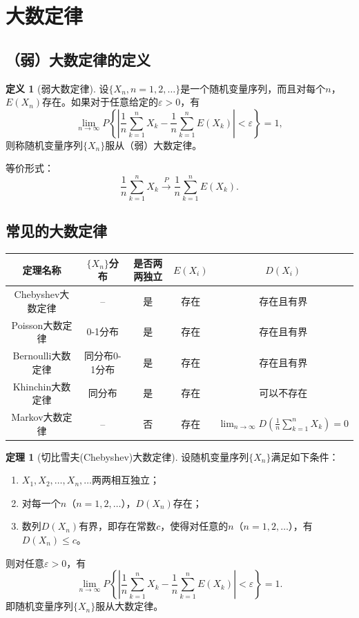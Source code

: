 \documentclass[11pt,a4paper]{report}
\theoremstyle{definition}
\newtheorem{definition}{定义}[chapter]
\newtheorem{theorem}{定理}[chapter]
\theoremstyle{plain}
\begin{document}
\section{大数定律}

\subsection{（弱）大数定律的定义}

\begin{definition}[弱大数定律]
设$\{X_n,n=1,2,\ldots\}$是一个随机变量序列，而且对每个$n$，$E(X_n)$存在。如果对于任意给定的$\varepsilon>0$，有
\[
\lim_{n\to\infty}P\left\{\left|\frac{1}{n}\sum_{k=1}^{n}X_k-\frac{1}{n}\sum_{k=1}^{n}E(X_k)\right|<\varepsilon\right\}=1,
\]
则称随机变量序列$\{X_n\}$服从（弱）大数定律。
\end{definition}

等价形式：
\[
\frac{1}{n}\sum_{k=1}^{n}X_k\stackrel{P}{\longrightarrow}\frac{1}{n}\sum_{k=1}^{n}E(X_k).
\]

\subsection{常见的大数定律}

\begin{center}
\begin{tabular}{c|c|c|c|c}
\hline
定理名称 & $\{X_n\}$分布 & 是否两两独立 & $E(X_i)$ & $D(X_i)$ \\
\hline
Chebyshev大数定律 & -- & 是 & 存在 & 存在且有界 \\
\hline
Poisson大数定律 & 0-1分布 & 是 & 存在 & 存在且有界 \\
\hline
Bernoulli大数定律 & 同分布0-1分布 & 是 & 存在 & 存在且有界 \\
\hline
Khinchin大数定律 & 同分布 & 是 & 存在 & 可以不存在 \\
\hline
Markov大数定律 & -- & 否 & 存在 & $\displaystyle\lim_{n\to\infty}D\left(\frac{1}{n}\sum_{k=1}^{n}X_k\right)=0$ \\
\hline
\end{tabular}
\end{center}

\begin{theorem}[切比雪夫(Chebyshev)大数定律]
设随机变量序列$\{X_n\}$满足如下条件：
\begin{enumerate}[label=(\arabic*),leftmargin=2em]
    \item $X_1,X_2,\ldots,X_n,\ldots$两两相互独立；
    \item 对每一个$n$（$n=1,2,\ldots$），$D(X_n)$存在；
    \item 数列$D(X_n)$有界，即存在常数$c$，使得对任意的$n$（$n=1,2,\ldots$），有$D(X_n)\leq c$。
\end{enumerate}
则对任意$\varepsilon>0$，有
\[
\lim_{n\to\infty}P\left\{\left|\frac{1}{n}\sum_{k=1}^{n}X_k-\frac{1}{n}\sum_{k=1}^{n}E(X_k)\right|<\varepsilon\right\}=1.
\]
即随机变量序列$\{X_n\}$服从大数定律。
\end{theorem}
\end{document}
